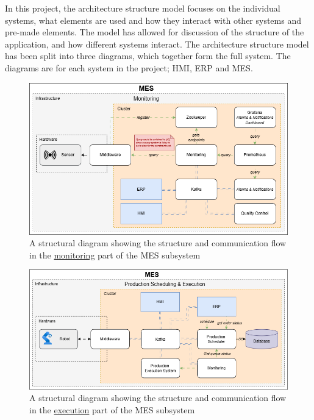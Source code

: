In this project, the architecture structure model focuses on the individual systems, what elements are used and how they interact with other systems and pre-made elements. The model has allowed for discussion of the structure of the application, and how different systems interact. The architecture structure model has been split into three diagrams, which together form the full system. The diagrams are for each system in the project; HMI, ERP and MES.

\begin{figure}[hbt]
    \centering
    \caption{A structural diagram showing the structure and communication flow in the \underline{monitoring} part of the MES subsystem}
    \label{fig:systems_and_subsystems-mes_monitoring_systemdiagram}
    \includegraphics[width=1\linewidth]{images/MES_monitoring.png}
\end{figure}

\begin{figure}[hbt]
    \centering
    \caption{A structural diagram showing the structure and communication flow in the \underline{execution} part of the MES subsystem}
    \label{fig:systems_and_subsystems-mes_execution_systemdiagram}
    \includegraphics[width=1\linewidth]{images/mes-execution.png}
\end{figure}

